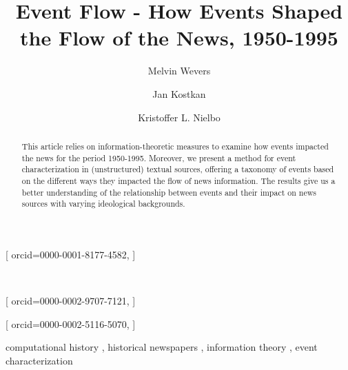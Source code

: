\documentclass[]{ceurart}
\begin{document}



\title{Event Flow - How Events Shaped the Flow of the News, 1950-1995}

\author[1]{Melvin Wevers}[%
orcid=0000-0001-8177-4582,
]
\address[1]{Department of History, University of Amsterdam, Amsterdam, the Netherlands}
\

\author[2]{Jan Kostkan}[%
orcid=0000-0002-9707-7121,
]
\

\author[2]{Kristoffer L. Nielbo}[%
orcid=0000-0002-5116-5070,
]
\address[2]{Center for Humanities Computing Aarhus, Aarhus University, Denmark}



\begin{abstract}
This article relies on information-theoretic measures to examine how events impacted the news for the period 1950-1995. Moreover, we present a method for event characterization in (unstructured) textual sources, offering a taxonomy of events based on the different ways they impacted the flow of news information. The results give us a better understanding of the relationship between events and their impact on news sources with varying ideological backgrounds.
\end{abstract}

\begin{keywords}
  computational history \sep
  historical newspapers \sep
  information theory \sep
  event characterization
\end{keywords}


\maketitle
\end{document}
